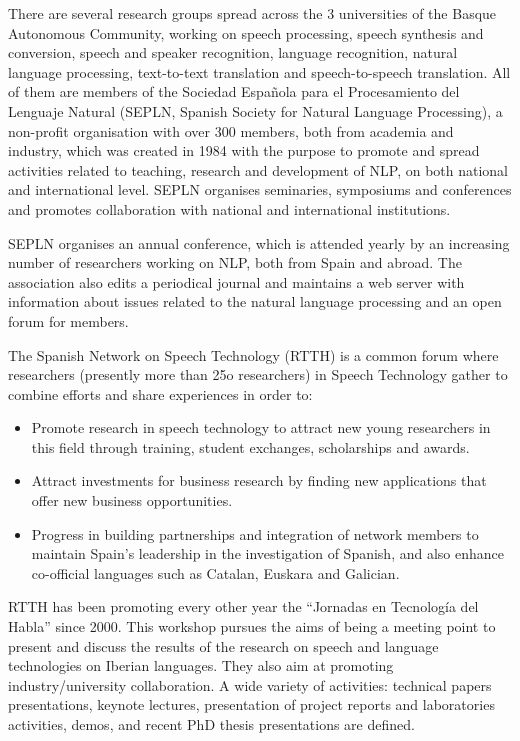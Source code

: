 \begin{multicols}{2}
There are several research groups spread across the 3 universities of the Basque Autonomous Community, working on speech processing, speech synthesis and conversion, speech and speaker recognition, language recognition, natural language processing, text-to-text translation and speech-to-speech translation. All of them are members of the Sociedad Española para el Procesamiento del Lenguaje Natural (SEPLN, Spanish Society for Natural Language Processing), a non-profit organisation with over 300 members, both from academia and industry, which was created in 1984 with the purpose to promote and spread activities related to teaching, research and development of NLP, on both national and international level. SEPLN organises seminaries, symposiums and conferences and promotes collaboration with national and international institutions.

SEPLN organises an annual conference, which is attended yearly by an increasing number of researchers working on NLP, both from Spain and abroad. The association also edits a periodical journal and maintains a web server with information about issues related to the natural language processing and an open forum for members.

The Spanish Network on Speech Technology (RTTH) \cite{BAS-Nota36}  is a common forum where researchers (presently more than 25o researchers) in Speech Technology gather to combine efforts and share experiences in order to:
\begin{itemize}

       \item Promote research in speech technology to attract new young researchers in this field through training, student exchanges, scholarships and awards.
       
       \item Attract investments for business research by finding new applications that offer new business opportunities.  
      
      \item Progress in building partnerships and integration of network members to maintain Spain's leadership in the investigation of Spanish, and also enhance co-official languages such as Catalan, Euskara and Galician.

\end{itemize}

RTTH has been promoting every other year the “Jornadas en Tecnología del Habla” since 2000. This workshop pursues the aims of being a meeting point to present and discuss the results of the research on speech and language technologies on Iberian languages. They also aim at promoting industry/university collaboration. A wide variety of activities: technical papers presentations, keynote lectures, presentation of project reports and laboratories activities, demos, and recent PhD thesis presentations are defined.


\end{multicols}
